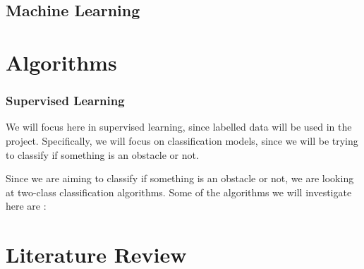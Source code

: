 \documentclass[conference]{IEEEtran}
\begin{document}
\subsection{Machine Learning}


\section{Algorithms}
\subsubsection{Supervised Learning}
We will focus here in supervised learning, since labelled data will be used in the project. Specifically, we will focus on classification models, since we will be trying to classify if something is an obstacle or not.

Since we are aiming to classify if something is an obstacle or not, we are looking at two-class classification algorithms. Some of the algorithms we will investigate here are \cite{azure}:


\section{Literature Review}






\printbibliography
\vspace{12pt}
\end{document}
